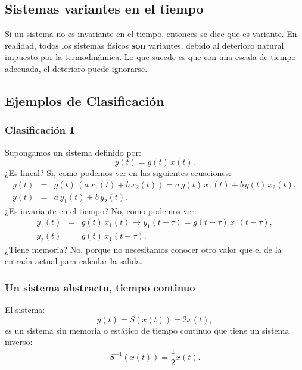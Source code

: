 \subsection{Sistemas variantes en el tiempo}
Si un sistema no es invariante en el tiempo, entonces se dice que es variante. En realidad, todos los sistemas físicos \textbf{son} variantes, debido al deterioro natural impuesto por la termodinámica. Lo que sucede es que con una escala de tiempo adecuada, el deterioro puede ignorarse.

\subsection{Ejemplos de Clasificación}

\subsubsection{Clasificación 1}
Supongamos un sistema definido por:
\begin{equation}
	y(t) = g(t) \, x(t).
\end{equation}
¿Es lineal? Si, como podemos ver en las siguientes ecuaciones:
\begin{eqnarray}
	y(t) &=& g(t) \, (a \, x_{1}(t) + b \, x_{2}(t)) = a \, g(t) \, x_{1}(t) + b \, g(t) \, x_{2}(t),    \\
	y(t) &=& a \, y_{1}(t) + b \, y_{2}(t).
\end{eqnarray}
¿Es invariante en el tiempo? No, como podemos ver:
\begin{eqnarray}
	y_{1}(t) &=& g(t) \, x_{1}(t) \rightarrow y_{1}(t-\tau) = g(t-\tau) \, x_{1}(t-\tau), \\
	y_{2}(t) &=& g(t) \, x_{1}(t-\tau).
\end{eqnarray}
¿Tiene memoria? No, porque no necesitamos conocer otro valor que el de la entrada actual para calcular la salida.

\subsubsection{Un sistema abstracto, tiempo continuo}
El sistema:
\begin{equation}
	y(t) = S(x(t)) = 2 x(t),
\end{equation}
es un sistema sin memoria o estático de tiempo continuo que tiene un sistema inverso:
\begin{equation}
	S^{-1}(x(t)) = \frac{1}{2} x(t).
\end{equation}


